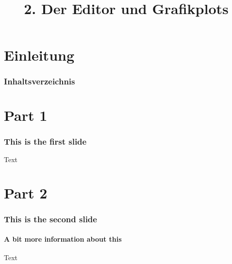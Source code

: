 

\title{\\{\scriptsize 2. Der Editor und Grafikplots}}


  

    \section{Einleitung}
    \begin{frame}
        \frametitle{Inhaltsverzeichnis}
        \tableofcontents[currentsection]
    \end{frame}

    \section{Part 1}
    \begin{frame}
        \frametitle{This is the first slide}
        Text
    \end{frame}

    \section{Part 2}
    \begin{frame}
        \frametitle{This is the second slide}
        \framesubtitle{A bit more information about this}
        Text
    \end{frame}

